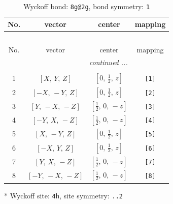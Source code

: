 \documentclass[fleqn,8pt]{jsarticle}
\begin{document}
\begin{longtable}{cccc}
\caption{Wyckoff bond: {\tt 8g@2g}, bond symmetry: {\tt 1}}
 \\
 \hline \hline
No. & vector & center & mapping \\ \hline \endfirsthead

\multicolumn{3}{l}{\tablename\ \thetable{}} \\
 \hline \hline
No. & vector & center & mapping \\ \hline \endhead

 \hline \hline
\multicolumn{3}{r}{\footnotesize\it continued ...} \\ \endfoot

 \hline \hline
\multicolumn{3}{r}{} \\ \endlastfoot

1 & $\left[ X,\, Y,\, Z \right]$ & $\left[ 0,\, \frac{1}{2},\, z \right]$ & {\tt [1]} \\ \hline
2 & $\left[ - X,\, - Y,\, Z \right]$ & $\left[ 0,\, \frac{1}{2},\, z \right]$ & {\tt [2]} \\ \hline
3 & $\left[ Y,\, - X,\, - Z \right]$ & $\left[ \frac{1}{2},\, 0,\, - z \right]$ & {\tt [3]} \\ \hline
4 & $\left[ - Y,\, X,\, - Z \right]$ & $\left[ \frac{1}{2},\, 0,\, - z \right]$ & {\tt [4]} \\ \hline
5 & $\left[ X,\, - Y,\, Z \right]$ & $\left[ 0,\, \frac{1}{2},\, z \right]$ & {\tt [5]} \\ \hline
6 & $\left[ - X,\, Y,\, Z \right]$ & $\left[ 0,\, \frac{1}{2},\, z \right]$ & {\tt [6]} \\ \hline
7 & $\left[ Y,\, X,\, - Z \right]$ & $\left[ \frac{1}{2},\, 0,\, - z \right]$ & {\tt [7]} \\ \hline
8 & $\left[ - Y,\, - X,\, - Z \right]$ & $\left[ \frac{1}{2},\, 0,\, - z \right]$ & {\tt [8]} \\
\end{longtable}
* Wyckoff site: {\tt 4h}, site symmetry: {\tt ..2}
\renewcommand{\arraystretch}{1.2}
\end{document}
